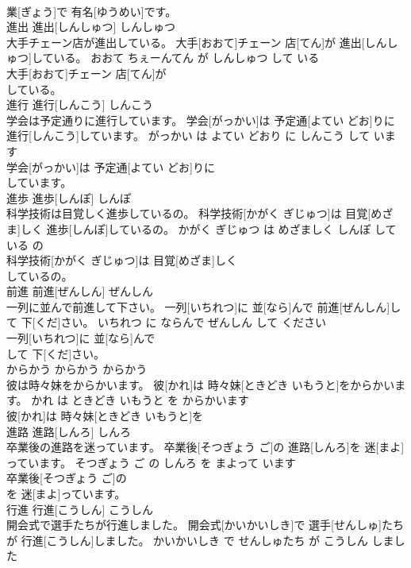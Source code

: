 \documentclass[8pt]{extreport}
\begin{document}
\begin{CJK}{UTF8}{min}
\\	業[ぎょう]で 有名[ゆうめい]です。			
\\	進出	進出[しんしゅつ]	しんしゅつ	
\\	大手チェーン店が進出している。	大手[おおて]チェーン 店[てん]が 進出[しんしゅつ]している。	おおて ちぇーんてん が しんしゅつ して いる	
\\	大手[おおて]チェーン 店[てん]が
\\	している。			
\\	進行	進行[しんこう]	しんこう	
\\	学会は予定通りに進行しています。	学会[がっかい]は 予定通[よてい どお]りに 進行[しんこう]しています。	がっかい は よてい どおり に しんこう して います	
\\	学会[がっかい]は 予定通[よてい どお]りに
\\	しています。			
\\	進歩	進歩[しんぽ]	しんぽ	
\\	科学技術は目覚しく進歩しているの。	科学技術[かがく ぎじゅつ]は 目覚[めざま]しく 進歩[しんぽ]しているの。	かがく ぎじゅつ は めざましく しんぽ して いる の	
\\	科学技術[かがく ぎじゅつ]は 目覚[めざま]しく
\\	しているの。			
\\	前進	前進[ぜんしん]	ぜんしん	
\\	一列に並んで前進して下さい。	一列[いちれつ]に 並[なら]んで 前進[ぜんしん]して 下[くだ]さい。	いちれつ に ならんで ぜんしん して ください	
\\	一列[いちれつ]に 並[なら]んで
\\	して 下[くだ]さい。			
\\	からかう	からかう	からかう	
\\	彼は時々妹をからかいます。	彼[かれ]は 時々妹[ときどき いもうと]をからかいます。	かれ は ときどき いもうと を からかいます	
\\	彼[かれ]は 時々妹[ときどき いもうと]を
\\	進路	進路[しんろ]	しんろ	
\\	卒業後の進路を迷っています。	卒業後[そつぎょう ご]の 進路[しんろ]を 迷[まよ]っています。	そつぎょう ご の しんろ を まよって います	
\\	卒業後[そつぎょう ご]の
\\	を 迷[まよ]っています。			
\\	行進	行進[こうしん]	こうしん	
\\	開会式で選手たちが行進しました。	開会式[かいかいしき]で 選手[せんしゅ]たちが 行進[こうしん]しました。	かいかいしき で せんしゅたち が こうしん しました	

\end{CJK}
\end{document}
